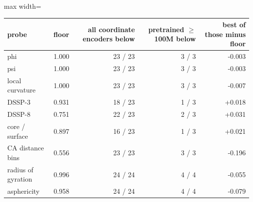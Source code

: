\begin{adjustbox}{max width=\linewidth}
\begin{tabular}{lrrrr}
\toprule
\rowcolor{CompassLavender!32}
probe & floor & all coordinate encoders below & pretrained $\ge$100M below & best of those minus floor \\
\midrule
phi & 1.000 & 23 / 23 & 3 / 3 & -0.003 \\
psi & 1.000 & 23 / 23 & 3 / 3 & -0.003 \\
local curvature & 1.000 & 23 / 23 & 3 / 3 & -0.007 \\
DSSP-3 & 0.931 & 18 / 23 & 1 / 3 & +0.018 \\
DSSP-8 & 0.751 & 22 / 23 & 2 / 3 & +0.031 \\
core / surface & 0.897 & 16 / 23 & 1 / 3 & +0.021 \\
CA distance bins & 0.556 & 23 / 23 & 3 / 3 & -0.196 \\
radius of gyration & 0.996 & 24 / 24 & 4 / 4 & -0.055 \\
asphericity & 0.958 & 24 / 24 & 4 / 4 & -0.079 \\
\bottomrule
\end{tabular}
\end{adjustbox}

